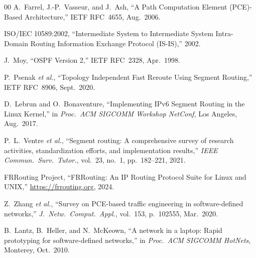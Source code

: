 \documentclass[conference]{IEEEtran}
\begin{document}
\begin{thebibliography}{00}
A.~Farrel, J.-P.~Vasseur, and J.~Ash,
``A Path Computation Element (PCE)-Based Architecture,''
IETF RFC~4655, Aug.\ 2006.

ISO/IEC 10589:2002,
``Intermediate System to Intermediate System Intra-Domain Routing
Information Exchange Protocol (IS-IS),'' 2002.

J.~Moy,
``OSPF Version 2,''
IETF RFC~2328, Apr.\ 1998.

P.~Psenak \textit{et al.},
``Topology Independent Fast Reroute Using Segment Routing,''
IETF RFC~8906, Sept.\ 2020.

D.~Lebrun and O.~Bonaventure,
``Implementing IPv6 Segment Routing in the Linux Kernel,''
in \textit{Proc.\ ACM SIGCOMM Workshop NetConf}, Los Angeles,
Aug.\ 2017.

P.~L.~Ventre \textit{et al.},
``Segment routing: A comprehensive survey of research activities,
standardization efforts, and implementation results,''
\textit{IEEE Commun.\ Surv.\ Tutor.}, vol.~23, no.~1,
pp.~182--221, 2021.

FRRouting Project,
``FRRouting: An IP Routing Protocol Suite for Linux and UNIX,''
\url{https://frrouting.org}, 2024.

Z.~Zhang \textit{et al.},
``Survey on PCE-based traffic engineering in software-defined networks,''
\textit{J.\ Netw.\ Comput.\ Appl.}, vol.~153, p.~102555, Mar.\ 2020.

B.~Lantz, B.~Heller, and N.~McKeown,
``A network in a laptop: Rapid prototyping for software-defined
networks,'' in \textit{Proc.\ ACM SIGCOMM HotNets}, Monterey,
Oct.\ 2010.

\end{thebibliography}
\end{document}
